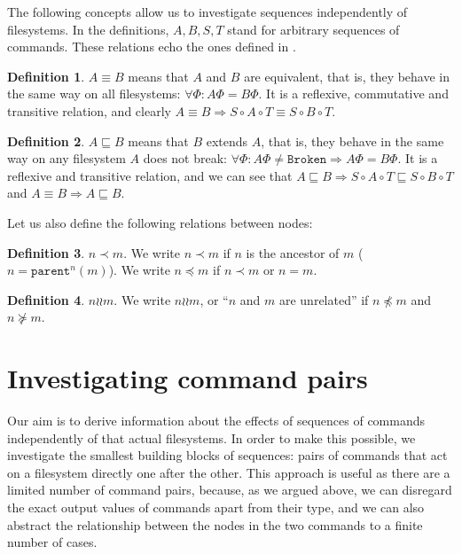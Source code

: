 \documentclass[12pt]{article}
\newcommand{\parent}{\mathtt{parent}}
\newcommand{\fsbroken}{\mathtt{Broken}} %
\newcommand{\FS}{\Phi} %
\newcommand{\cc}{\circ} %
\newcommand{\descendant}{\prec}
\newcommand{\descendantEq}{\preceq}
\newcommand{\ancestorEq}{\succeq}
\newcommand{\eqext}{\sqsubseteq} %
\newcommand{\indep}{\mathrel{\wr\wr}} %
\newcommand{\unrel}{\indep} %
\theoremstyle{definition}
\newtheorem{mydef}{Definition}
\begin{document}
The following concepts allow us to investigate sequences independently of filesystems.
In the definitions, $A,B,S,T$ stand for arbitrary sequences of commands.
These relations echo the ones defined in \cite{NREC:alg}.

\begin{mydef}
$A\equiv B$ means that $A$ and $B$ are equivalent,
that is, they behave in the same way on
all filesystems: $\forall \FS: A\FS=B\FS$.
It is a reflexive, commutative and transitive relation,
and clearly
$ A\equiv B \Rightarrow S\cc A\cc T\equiv S\cc B\cc T $.
\end{mydef}

\begin{mydef}
$A\eqext B$ means that $B$ extends $A$,
that is, they behave in the same way
on any filesystem $A$ does not break:
$\forall \FS: A\FS\neq\fsbroken\Rightarrow A\FS=B\FS$.
It is a reflexive and transitive relation,
and we can see that
$ A\eqext B \Rightarrow S\cc A\cc T\eqext S\cc B\cc T$
and
$ A\equiv B \Rightarrow A\eqext B$.
\end{mydef}

Let us also define the following relations between nodes:

\begin{mydef}{$n\descendant m$.}
We write $n\descendant m$ if $n$ is the ancestor of $m$ ($n=\parent^n(m)$). %
We write $n\descendantEq m$ if $n\descendant m$ or $n=m$.
\end{mydef}

\begin{mydef}{$n\unrel m$.}
We write $n\unrel m$, or ``$n$ and $m$ are unrelated'' if $n\not\descendantEq m$ and $n\not\ancestorEq m$.
\end{mydef}



\section{Investigating command pairs}\label{section_axioms}

Our aim is to derive information about the effects of sequences
of commands independently of that actual filesystems.
In order to make this possible, we investigate the smallest building
blocks of sequences: pairs of commands that act on a filesystem directly one after the other.
This approach is useful as there are a limited number of command pairs,
because, as we argued above, we can disregard the exact output values of commands apart from their type,
and we can also abstract the relationship between the nodes in the two commands
to a finite number of cases.
\end{document}
